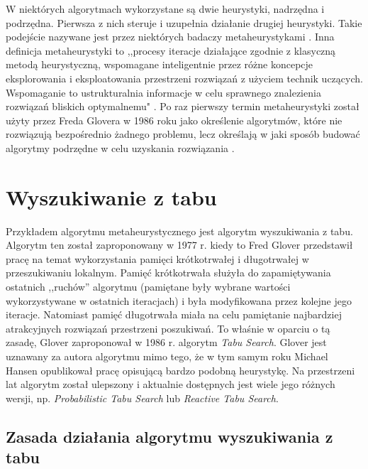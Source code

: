 W niektórych algorytmach wykorzystane są dwie heurystyki, nadrzędna i podrzędna. Pierwsza z nich steruje i uzupełnia działanie drugiej heurystyki. Takie podejście nazywane jest przez niektórych badaczy metaheurystykami \cite{Algorytmy:Widuch}. Inna definicja metaheurystyki to ,,procesy iteracje działające zgodnie z klasyczną metodą heurystyczną, wspomagane inteligentnie przez różne koncepcje eksplorowania i eksploatowania przestrzeni rozwiązań z użyciem technik uczących. Wspomaganie to ustrukturalnia informacje w celu sprawnego znalezienia rozwiązań bliskich optymalnemu" \cite{Metaheurystyki:Osman}. Po raz pierwszy termin metaheurystyki został użyty przez Freda Glovera w 1986 roku jako określenie algorytmów, które nie rozwiązują bezpośrednio żadnego problemu, lecz określają w jaki sposób budować algorytmy podrzędne w celu uzyskania rozwiązania \cite{Future:Glover}.

\section{Wyszukiwanie z tabu}

Przykładem algorytmu metaheurystycznego jest algorytm wyszukiwania z tabu. Algorytm ten został zaproponowany w 1977 r. kiedy to Fred Glover przedstawił pracę na temat wykorzystania pamięci krótkotrwałej i długotrwałej w przeszukiwaniu lokalnym. Pamięć krótkotrwała służyła do zapamiętywania ostatnich ,,ruchów'' algorytmu (pamiętane były wybrane wartości wykorzystywane w ostatnich iteracjach) i była modyfikowana przez kolejne jego iteracje. Natomiast pamięć długotrwała miała na celu pamiętanie najbardziej atrakcyjnych rozwiązań przestrzeni poszukiwań. To właśnie w oparciu o tą zasadę, Glover zaproponował w 1986 r. algorytm \textit{Tabu Search}. Glover jest uznawany za autora algorytmu mimo tego, że w tym samym roku Michael Hansen opublikował pracę opisującą bardzo podobną heurystykę. Na przestrzeni lat algorytm został ulepszony i aktualnie dostępnych jest wiele jego różnych wersji, np. \textit{Probabilistic Tabu Search} lub \textit{Reactive Tabu Search}.

\subsection{Zasada działania algorytmu wyszukiwania z tabu}

